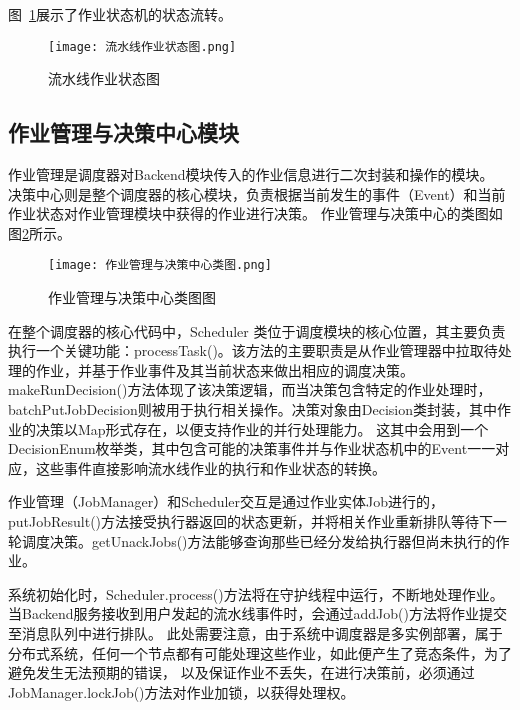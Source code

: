 图~\ref{fig:流水线作业状态图}展示了作业状态机的状态流转。

\begin{figure}[h]
  \centering
  \texttt{[image: 流水线作业状态图.png]}
  \caption{流水线作业状态图}
  \label{fig:流水线作业状态图}
\end{figure}



\subsection{作业管理与决策中心模块}

作业管理是调度器对Backend模块传入的作业信息进行二次封装和操作的模块。
决策中心则是整个调度器的核心模块，负责根据当前发生的事件（Event）和当前作业状态对作业管理模块中获得的作业进行决策。
作业管理与决策中心的类图如图\ref{fig:作业管理与决策中心类图}所示。

\begin{figure}[h]
  \centering
  \texttt{[image: 作业管理与决策中心类图.png]}
  \caption{作业管理与决策中心类图图}
  \label{fig:作业管理与决策中心类图}
\end{figure}

在整个调度器的核心代码中，Scheduler 类位于调度模块的核心位置，其主要负责执行一个关键功能：processTask()。该方法的主要职责是从作业管理器中拉取待处理的作业，并基于作业事件及其当前状态来做出相应的调度决策。
makeRunDecision()方法体现了该决策逻辑，而当决策包含特定的作业处理时，batchPutJobDecision则被用于执行相关操作。决策对象由Decision类封装，其中作业的决策以Map形式存在，以便支持作业的并行处理能力。
这其中会用到一个DecisionEnum枚举类，其中包含可能的决策事件并与作业状态机中的Event一一对应，这些事件直接影响流水线作业的执行和作业状态的转换。

作业管理（JobManager）和Scheduler交互是通过作业实体Job进行的，putJobResult()方法接受执行器返回的状态更新，并将相关作业重新排队等待下一轮调度决策。getUnackJobs()方法能够查询那些已经分发给执行器但尚未执行的作业。

系统初始化时，Scheduler.process()方法将在守护线程中运行，不断地处理作业。当Backend服务接收到用户发起的流水线事件时，会通过addJob()方法将作业提交至消息队列中进行排队。
此处需要注意，由于系统中调度器是多实例部署，属于分布式系统，任何一个节点都有可能处理这些作业，如此便产生了竞态条件，为了避免发生无法预期的错误，
以及保证作业不丢失，在进行决策前，必须通过JobManager.lockJob()方法对作业加锁，以获得处理权。

